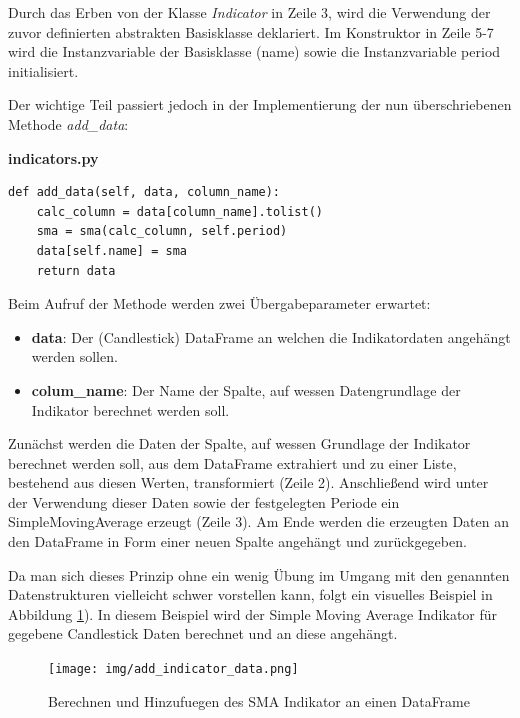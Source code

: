 \documentclass[oneside]{ausarbeitung}
\begin{document}
Durch das Erben von der Klasse \textit{Indicator} in Zeile 3, wird die Verwendung der zuvor definierten abstrakten Basisklasse deklariert. Im Konstruktor in Zeile 5-7 wird die Instanzvariable der Basisklasse (name) sowie die Instanzvariable period initialisiert.

Der wichtige Teil passiert jedoch in der Implementierung der nun überschriebenen Methode \textit{add\_data}:

\lstset{language=Python}
\lstset{frame=lines}
\lstset{basicstyle=\footnotesize}
\textbf{indicators.py}
\begin{lstlisting}
def add_data(self, data, column_name):
	calc_column = data[column_name].tolist()
	sma = sma(calc_column, self.period)
	data[self.name] = sma
	return data
\end{lstlisting}

Beim Aufruf der Methode werden zwei Übergabeparameter erwartet:
\begin{itemize}
	\item \textbf{data}: Der (Candlestick) DataFrame an welchen die Indikatordaten
		angehängt werden sollen.
	\item \textbf{colum\_name}: Der Name der Spalte, auf wessen Datengrundlage der
		Indikator berechnet werden soll.
\end{itemize}

Zunächst werden die Daten der Spalte, auf wessen Grundlage der Indikator berechnet werden soll, aus dem DataFrame extrahiert und zu einer Liste, bestehend aus diesen Werten, transformiert (Zeile 2). Anschließend wird unter der Verwendung dieser Daten sowie der festgelegten Periode ein SimpleMovingAverage erzeugt (Zeile 3). Am Ende werden die erzeugten Daten an den DataFrame in Form einer neuen Spalte angehängt und zurückgegeben.

Da man sich dieses Prinzip ohne ein wenig Übung im Umgang mit den genannten Datenstrukturen vielleicht schwer vorstellen kann, folgt ein visuelles Beispiel in Abbildung \ref{fig:17}). In diesem Beispiel wird der Simple Moving Average Indikator für gegebene Candlestick Daten berechnet und an diese angehängt.

\begin{figure}[H]
  \centering
  \texttt{[image: img/add\_indicator\_data.png]}
  \caption{Berechnen und Hinzufuegen des SMA Indikator an einen DataFrame}
  \label{fig:17}
\end{figure}
\end{document}
